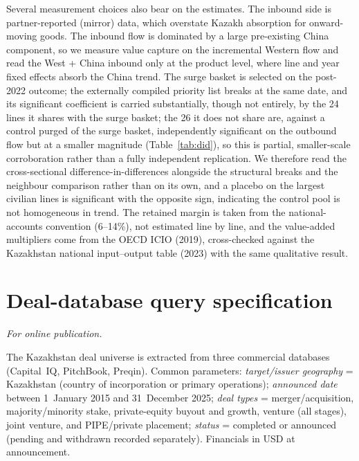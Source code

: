 \documentclass[12pt]{article}
\begin{document}
Several measurement choices also bear on the estimates. The inbound side is partner-reported
(mirror) data, which overstate Kazakh absorption for onward-moving goods. The inbound flow is
dominated by a large pre-existing China component, so we measure value capture on the
incremental Western flow and read the West + China inbound only at the product level, where
line and year fixed effects absorb the China trend. The surge basket is selected on the
post-2022 outcome; the externally compiled priority list breaks at the same date, and its
significant coefficient is carried substantially, though not entirely, by the 24 lines it
shares with the surge basket; the 26 it does not share are, against a control purged of the
surge basket, independently significant on the outbound flow but at a smaller magnitude
(Table~\ref{tab:did}), so this is partial, smaller-scale corroboration
rather than a fully independent replication. We
therefore read the cross-sectional difference-in-differences alongside the structural breaks
and the neighbour comparison rather than on its own, and a placebo on the largest civilian lines
is significant with the opposite sign, indicating the control pool is not homogeneous in
trend. The retained margin is taken from the national-accounts convention (6--14\%), not
estimated line by line, and the value-added multipliers come from the OECD ICIO (2019),
cross-checked against the Kazakhstan national input--output table (2023) with the same
qualitative result.

\appendix
\renewcommand{\thesection}{\Alph{section}}

\section{Deal-database query specification}\label{app:deals}
\emph{For online publication.}

\medskip
The Kazakhstan deal universe is extracted from three commercial databases (Capital~IQ,
PitchBook, Preqin). Common parameters: \emph{target/issuer geography} = Kazakhstan (country of
incorporation or primary
operations); \emph{announced date} between 1~January 2015 and 31~December 2025; \emph{deal
types} = merger/acquisition, majority/minority stake, private-equity buyout and growth,
venture (all stages), joint venture, and PIPE/private placement; \emph{status} = completed or
announced (pending and withdrawn recorded separately). Financials in USD at announcement.
\end{document}
